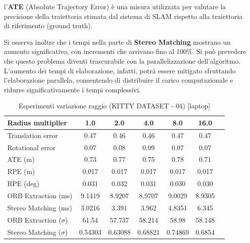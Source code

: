 \documentclass[12pt,a4paper]{report}
\begin{document}
l'\textbf{ATE} (Absolute Trajectory Error) è una misura utilizzata per valutare la precisione della traiettoria stimata dal sistema di SLAM rispetto alla traiettoria di riferimento (ground truth).

Si osserva inoltre che i tempi nella parte di \textbf{Stereo Matching} mostrano un aumento significativo, con incrementi che arrivano fino al 100\%. Si può prevedere che questo problema diventi trascurabile con la parallelizzazione dell'algoritmo. L'aumento dei tempi di elaborazione, infatti, potrà essere mitigato sfruttando l'elaborazione parallela, consentendo di distribuire il carico computazionale e ridurre significativamente i tempi complessivi.



\begin{table}[h]
    \centering
    \caption{Esperimenti variazione raggio (KITTY DATASET - 04) [laptop] }
    \begin{tabular}{lcccccc}
        \toprule
        \rowcolor{gray!20}
        Radius multiplier & 1.0 & \cellcolor{orange!40}2.0 & 4.0 & 8.0 & 16.0 \\
        \midrule
        Translation error & 0.47 & \cellcolor{green!20}0.46 & \cellcolor{green!20}0.46 & 0.47 & 0.47 \\
        Rotational error  & \cellcolor{green!20}0.07 & 0.08 & 0.09 & \cellcolor{green!20}0.07 & \cellcolor{green!20}0.07 \\
        ATE (m)           & 0.73 & 0.77 & 0.75 & 0.78 & \cellcolor{green!20}0.71 \\
        RPE (m)           & \cellcolor{green!20}0.017 & \cellcolor{green!20}0.017 & \cellcolor{green!20}0.017 & \cellcolor{green!20}0.017 & \cellcolor{green!20}0.017 \\
        RPE (deg)         & 0.031 & 0.032 & 0.031 & \cellcolor{green!20}0.030 & \cellcolor{green!20}0.030 \\
        ORB Extraction (ms) & 9.1419 & \cellcolor{green!20}8.9207 & \cellcolor{green!20}8.9707 & 9.0029 & 8.9305 \\
        Stereo Matching (ms) & \cellcolor{green!20}3.0216 & 3.391 & 3.962 & 4.8351 & 6.345 \\
        ORB Extraction ($\sigma$) & 61.54 & \cellcolor{green!20}57.737 & 58.214 & 58.98 & 58.148 \\
        Stereo Matching ($\sigma$) & \cellcolor{green!20}0.54303 & 0.63088 & 0.68821 & 0.74869 & 0.6854 \\
        \bottomrule
    \end{tabular}
\end{table}
\end{document}
